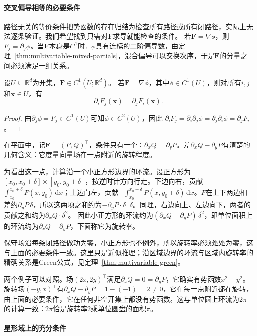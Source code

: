 \paragraph{交叉偏导相等的必要条件}

路径无关的等价条件把势函数的存在归结为检查所有路径或所有闭路径，实际上无法逐条验证。我们希望找到只需对$\bm F$求导就能检查的条件。
若$\bm F=\nabla\phi$，则$F_j=\partial_j\phi$。当$\bm F$本身是$C^1$时，$\phi$具有连续的二阶偏导数，由定理~\ref{thm:multivariable-mixed-partials}，混合偏导可以交换次序，于是$\bm F$的分量之间必须满足一组关系。
\begin{theorem}[保守场的必要条件]
设$U\subseteq\mathbb R^d$为开集，$\bm F\in C^1(U;\mathbb R^d)$。
若$\bm F=\nabla\phi$，其中$\phi\in C^1(U)$，则对所有$i,j$和$\bm x\in U$，有
\[
 \partial_iF_j(\bm x)=\partial_jF_i(\bm x).
\]
\end{theorem}
\begin{proof}
由$\partial_j\phi=F_j\in C^1(U)$可知$\phi\in C^2(U)$，因此
$\partial_iF_j=\partial_i\partial_j\phi=\partial_j\partial_i\phi=\partial_jF_i$。
\end{proof}

在平面中，记$\bm F=(P,Q)^\top$，条件只有一个：$\partial_xQ=\partial_yP$。差$\partial_xQ-\partial_yP$有清楚的几何含义：它度量向量场在一点附近的旋转程度。

为看出这一点，计算沿一个小正方形边界的环流。设正方形为$[x_0,x_0+\delta]\times[y_0,y_0+\delta]$，按逆时针方向行走。下边向右，贡献$\int_{x_0}^{x_0+\delta}P(x,y_0)\,\mathrm dx$；上边向左，贡献$-\int_{x_0}^{x_0+\delta}P(x,y_0+\delta)\,\mathrm dx$。$P$在上下两边相差约$\partial_yP\,\delta$，所以这两项之和约为$-\partial_yP\cdot\delta\cdot\delta$。同理，右边向上、左边向下，两者的贡献之和约为$\partial_xQ\cdot\delta^2$。
因此小正方形的环流约为$(\partial_xQ-\partial_yP)\,\delta^2$，即单位面积上的环流约为$\partial_xQ-\partial_yP$，下面称它为旋转率。

保守场沿每条闭路径做功为零，小正方形也不例外，所以旋转率必须处处为零，这与上面的必要条件一致。这里只是近似推理；沿区域边界的环流与区域内旋转率的精确关系是Green公式，见定理~\ref{thm:multivariable-green}。

两个例子可以对照。场$(2x,2y)^\top$满足$\partial_xQ=0=\partial_yP$，它确实有势函数$x^2+y^2$。旋转场$(-y,x)^\top$有$\partial_xQ-\partial_yP=1-(-1)=2\neq0$，它在每一点附近都在旋转，由上面的必要条件，它在任何非空开集上都没有势函数。这与单位圆上环流为$2\pi$的计算一致：$2\pi$恰是旋转率$2$乘单位圆盘的面积$\pi$。

\paragraph{星形域上的充分条件}

